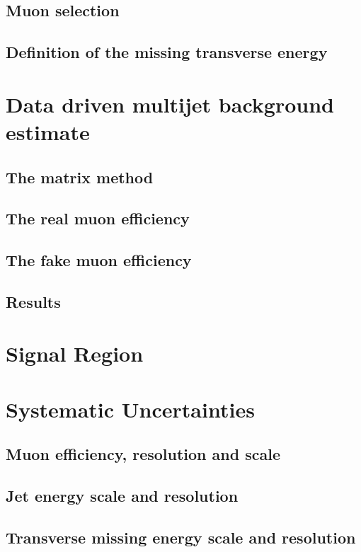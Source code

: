 \subsection{Muon selection}
\subsection{Definition of the missing transverse energy}

\section{Data driven multijet background estimate}
\label{sec:wprimeMultijetBackground}
\subsection{The matrix method}
\subsection{The real muon efficiency}
\subsection{The fake muon efficiency}
\subsection{Results}

\section{Signal Region}
\label{sec:wprimeSignalRegion}

\section{Systematic Uncertainties}
\label{sec:wprimeSystematics}
\subsection{Muon efficiency, resolution and scale}
\subsection{Jet energy scale and resolution}
\subsection{Transverse missing energy scale and resolution}
